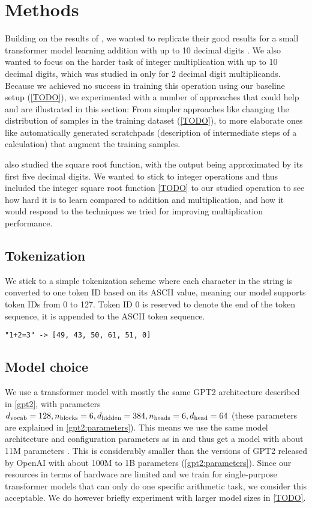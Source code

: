 \section{Methods}
\label{methods}

Building on the results of \cite{teaching}, we wanted to replicate their good results for a small transformer model learning addition with up to 10 decimal digits .
We also wanted to focus on the harder task of integer multiplication with up to 10 decimal digits, which was studied in \cite{teaching} only for 2 decimal digit multiplicands.
Because we achieved no success in training this operation using our baseline setup (\cref{TODO}), we experimented with a number of approaches that could help and are illustrated in this section: From simpler approaches like changing the distribution of samples in the training dataset (\cref{TODO}), to more elaborate ones like automatically generated scratchpads (description of intermediate steps of a calculation) that augment the training samples.

\cite{teaching} also studied the square root function, with the output being approximated by its first five decimal digits. We wanted to stick to integer operations and thus included the integer square root function \cref{TODO} to our studied operation to see how hard it is to learn compared to addition and multiplication, and how it would respond to the techniques we tried for improving multiplication performance.

\subsection{Tokenization}
\label{methods:token}

We stick to a simple tokenization scheme where each character in the string is converted to one token ID based on its ASCII value, meaning our model supports token IDs from 0 to 127. Token ID 0 is reserved to denote the end of the token sequence, it is appended to the ASCII token sequence.

\begin{lstlisting}
"1+2=3" -> [49, 43, 50, 61, 51, 0]
\end{lstlisting}


\subsection{Model choice}
\label{methods:model}

We use a transformer model with mostly the same GPT2 architecture described in \cref{gpt2}, with parameters ${d_\textrm{vocab}}=128, {n_\textrm{blocks}}=6, {d_\textrm{hidden}}=384, {n_\textrm{heads}}=6, {d_\textrm{head}}=64$ (these parameters are explained in \cref{gpt2:parameters}).
This means we use the same model architecture and configuration parameters as in \cite{teaching} and thus get a model with about 11M parameters . This is considerably smaller than the versions of GPT2 released by OpenAI with about 100M to 1B parameters (\cref{gpt2:parameters}).
Since our resources in terms of hardware are limited and we train for single-purpose transformer models that can only do one specific arithmetic task, we consider this acceptable.
We do however briefly experiment with larger model sizes in \cref{TODO}.

